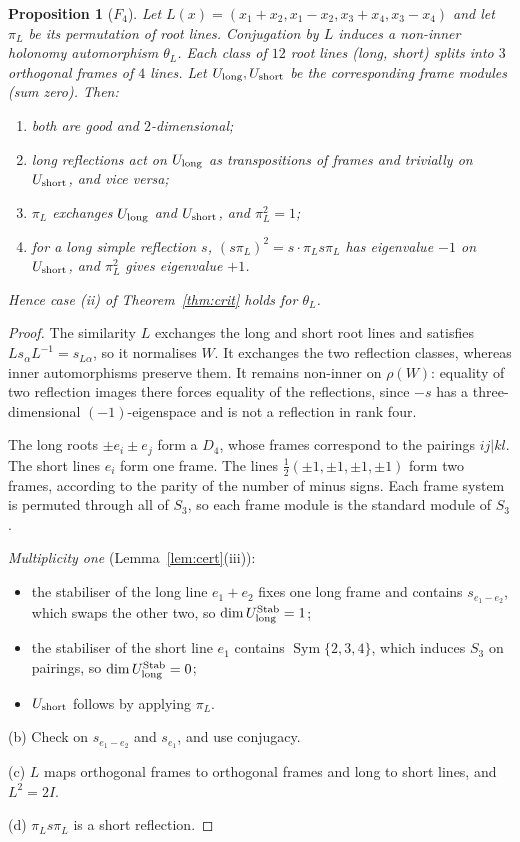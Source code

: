 \documentclass[11pt]{article}
\newtheorem{proposition}[theorem]{Proposition}
\theoremstyle{definition}
\newcommand{\Sym}{\operatorname{Sym}}
\begin{document}
\begin{proposition}[$F_4$]\label{prop:F4}
Let $L(x)=(x_1+x_2,x_1-x_2,x_3+x_4,x_3-x_4)$ and let $\pi_L$ be its permutation of root lines.
Conjugation by $L$ induces a non-inner holonomy automorphism $\theta_L$.
Each class of $12$ root lines (long, short) splits into $3$ orthogonal frames of $4$ lines. Let
$U_{\rm long},U_{\rm short}$ be the corresponding frame modules (sum zero). Then:
\begin{enumerate}[label=(\alph*)]
\item both are good and $2$-dimensional;
\item long reflections act on $U_{\rm long}$ as transpositions of frames and trivially on $U_{\rm short}$, and
vice versa;
\item $\pi_L$ exchanges $U_{\rm long}$ and $U_{\rm short}$, and $\pi_L^2=1$;
\item for a long simple reflection $s$, $(s\pi_L)^2=s\cdot\pi_Ls\pi_L$ has eigenvalue $-1$ on $U_{\rm short}$, and
$\pi_L^2$ gives eigenvalue $+1$.
\end{enumerate}
Hence case (ii) of Theorem~\ref{thm:crit} holds for $\theta_L$.
\end{proposition}

\begin{proof}
The similarity $L$ exchanges the long and short root lines and satisfies
$Ls_\alpha L^{-1}=s_{L\alpha}$, so it normalises $W$. It exchanges the two reflection classes,
whereas inner automorphisms preserve them. It remains non-inner on $\rho(W)$:
equality of two reflection images there forces equality of the reflections, since $-s$
has a three-dimensional $(-1)$-eigenspace and is not a reflection in rank four.

The long roots $\pm e_i\pm e_j$ form a $D_4$, whose frames correspond to the pairings $ij|kl$. The short lines
$e_i$ form one frame. The lines $\frac12(\pm1,\pm1,\pm1,\pm1)$ form two frames, according to the parity of the
number of minus signs. Each frame system is permuted through all of $S_3$, so each frame module is the standard
module of $S_3$.

\emph{Multiplicity one} (Lemma~\ref{lem:cert}(iii)):
\begin{itemize}
\item the stabiliser of the long line $e_1+e_2$ fixes one long frame and contains $s_{e_1-e_2}$, which swaps the
other two, so $\dim U_{\rm long}^{\rm Stab}=1$;
\item the stabiliser of the short line $e_1$ contains $\Sym\{2,3,4\}$, which induces $S_3$ on pairings, so
$\dim U_{\rm long}^{\rm Stab}=0$;
\item $U_{\rm short}$ follows by applying $\pi_L$.
\end{itemize}

(b) Check on $s_{e_1-e_2}$ and $s_{e_1}$, and use conjugacy.

(c) $L$ maps orthogonal frames to orthogonal frames and long to short lines, and $L^2=2I$.

(d) $\pi_Ls\pi_L$ is a short reflection.
\end{proof}
\end{document}
